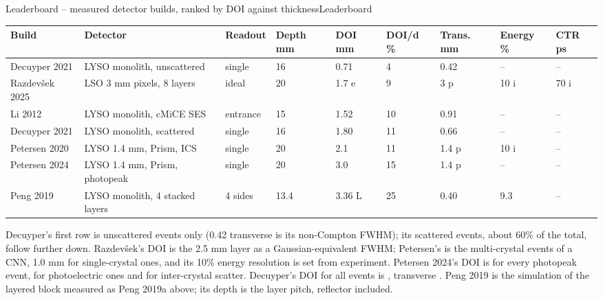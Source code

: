 \begin{programnote}{Leaderboard -- measured detector builds, ranked by DOI against thickness}{Leaderboard}
\begin{center}
\begin{scriptsize}
\setlength{\tabcolsep}{1.5pt}
\begin{tabular}{lllllllll}
\hline
Build & Detector & Readout & Depth mm & DOI mm & DOI/d \% & Trans. mm & Energy \% & CTR ps \\
\hline
Decuyper 2021 & LYSO monolith, unscattered & single & 16 & 0.71 & 4 & 0.42 & -- & -- \\
Razdevšek 2025 & LSO 3 mm pixels, 8 layers & ideal & 20 & 1.7 e & 9 & 3 p & 10 i & 70 i \\
Li 2012 & LYSO monolith, cMiCE SES & entrance & 15 & 1.52 & 10 & 0.91 & -- & -- \\
Decuyper 2021 & LYSO monolith, scattered & single & 16 & 1.80 & 11 & 0.66 & -- & -- \\
Petersen 2020 & LYSO 1.4 mm, Prism, ICS & single & 20 & 2.1 & 11 & 1.4 p & 10 i & -- \\
Petersen 2024 & LYSO 1.4 mm, Prism, photopeak & single & 20 & 3.0 & 15 & 1.4 p & -- & -- \\
Peng 2019 & LYSO monolith, 4 stacked layers & 4 sides & 13.4 & 3.36 L & 25 & 0.40 & 9.3 & -- \\
\hline
\end{tabular}
\end{scriptsize}
\end{center}

Decuyper's first row is unscattered events only (0.42 transverse is its
non-Compton FWHM); its scattered events, about 60\% of the total, follow
further down. Razdevšek's DOI is the 2.5 mm layer as a Gaussian-equivalent
FWHM; Petersen's is the multi-crystal events of a CNN, 1.0 mm for
single-crystal ones, and its 10\% energy resolution is set from experiment.
Petersen 2024's DOI is for every photopeak event,  for photoelectric
ones and  for inter-crystal scatter.
Decuyper's DOI for all events is , transverse . Peng 2019
is the simulation of the layered block measured as Peng 2019a above; its depth
is the  layer pitch, reflector included.


\end{programnote}
